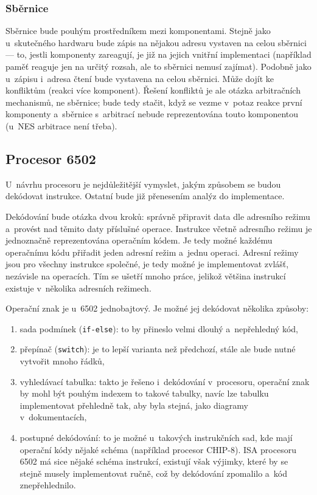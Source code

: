 \subsubsection{Sběrnice}
Sběrnice bude pouhým prostředníkem mezi komponentami. Stejně jako u~skutečného hardwaru bude zápis na nějakou adresu vystaven na celou sběrnici --- to, jestli komponenty zareagují, je již na jejich vnitřní implementaci (například paměť reaguje jen na určitý rozsah, ale to sběrnici nemusí zajímat). Podobně jako u~zápisu i~adresa čtení bude vystavena na celou sběrnici. Může dojít ke konfliktům (reakci více komponent). Řešení konfliktů je ale otázka arbitračních mechanismů, ne sběrnice; bude tedy stačit, když se vezme v~potaz reakce první komponenty a~sběrnice s~arbitrací nebude reprezentována touto komponentou (u~NES arbitrace není třeba).

\subsection{Procesor 6502}
U~návrhu procesoru je nejdůležitější vymyslet, jakým způsobem se budou dekódovat instrukce. Ostatní bude již přenesením analýz do implementace.

Dekódování bude otázka dvou kroků: správně připravit data dle adresního režimu a~provést nad těmito daty příslušné operace. Instrukce včetně adresního režimu je jednoznačně reprezentována operačním kódem. Je tedy možné každému operačnímu kódu přiřadit jeden adresní režim a~jednu operaci. Adresní režimy jsou pro všechny instrukce společné, je tedy možné je implementovat zvlášť, nezávisle na operacích. Tím se ušetří mnoho práce, jelikož většina instrukcí existuje v~několika adresních režimech.

Operační znak je u~6502 jednobajtový. Je možné jej dekódovat několika způsoby:
\begin{enumerate}
	\item sada podmínek (\texttt{if-else}): to by přineslo velmi dlouhý a~nepřehledný kód,
	\item přepínač (\texttt{switch}): je to lepší varianta než předchozí, stále ale bude nutné vytvořit mnoho řádků,
	\item vyhledávací tabulka: takto je řešeno i~dekódování v~procesoru, operační znak by mohl být pouhým indexem to takové tabulky, navíc lze tabulku implementovat přehledně tak, aby byla stejná, jako diagramy v~dokumentacích,
	\item postupné dekódování: to je možné u~takových instrukčních sad, kde mají operační kódy nějaké schéma (například procesor CHIP-8). ISA procesoru 6502 má sice nějaké schéma instrukcí, existují však výjimky, které by se stejně musely implementovat ručně, což by dekódování zpomalilo a~kód znepřehlednilo.
\end{enumerate}


